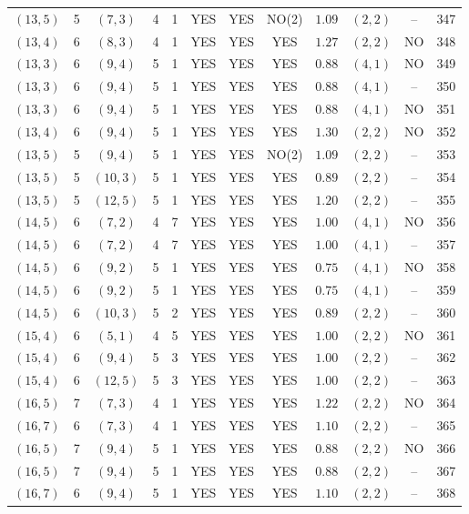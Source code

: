 \begin{longtable}{|c|c|c|c|c|c|c|c|c|c|c|c|}
$(13,5)$ & 5 & $(7,3)$ & 4 & 1 & YES & YES & NO(2) & $1.09$ & $(2,2)$ & -- & 347\\
$(13,4)$ & 6 & $(8,3)$ & 4 & 1 & YES & YES & YES & $1.27$ & $(2,2)$ & NO & 348\\
$(13,3)$ & 6 & $(9,4)$ & 5 & 1 & YES & YES & YES & $0.88$ & $(4,1)$ & NO & 349\\
$(13,3)$ & 6 & $(9,4)$ & 5 & 1 & YES & YES & YES & $0.88$ & $(4,1)$ & -- & 350\\
$(13,3)$ & 6 & $(9,4)$ & 5 & 1 & YES & YES & YES & $0.88$ & $(4,1)$ & NO & 351\\
$(13,4)$ & 6 & $(9,4)$ & 5 & 1 & YES & YES & YES & $1.30$ & $(2,2)$ & NO & 352\\
$(13,5)$ & 5 & $(9,4)$ & 5 & 1 & YES & YES & NO(2) & $1.09$ & $(2,2)$ & -- & 353\\
$(13,5)$ & 5 & $(10,3)$ & 5 & 1 & YES & YES & YES & $0.89$ & $(2,2)$ & -- & 354\\
$(13,5)$ & 5 & $(12,5)$ & 5 & 1 & YES & YES & YES & $1.20$ & $(2,2)$ & -- & 355\\
$(14,5)$ & 6 & $(7,2)$ & 4 & 7 & YES & YES & YES & $1.00$ & $(4,1)$ & NO & 356\\
$(14,5)$ & 6 & $(7,2)$ & 4 & 7 & YES & YES & YES & $1.00$ & $(4,1)$ & -- & 357\\
$(14,5)$ & 6 & $(9,2)$ & 5 & 1 & YES & YES & YES & $0.75$ & $(4,1)$ & NO & 358\\
$(14,5)$ & 6 & $(9,2)$ & 5 & 1 & YES & YES & YES & $0.75$ & $(4,1)$ & -- & 359\\
$(14,5)$ & 6 & $(10,3)$ & 5 & 2 & YES & YES & YES & $0.89$ & $(2,2)$ & -- & 360\\
$(15,4)$ & 6 & $(5,1)$ & 4 & 5 & YES & YES & YES & $1.00$ & $(2,2)$ & NO & 361\\
$(15,4)$ & 6 & $(9,4)$ & 5 & 3 & YES & YES & YES & $1.00$ & $(2,2)$ & -- & 362\\
$(15,4)$ & 6 & $(12,5)$ & 5 & 3 & YES & YES & YES & $1.00$ & $(2,2)$ & -- & 363\\
$(16,5)$ & 7 & $(7,3)$ & 4 & 1 & YES & YES & YES & $1.22$ & $(2,2)$ & NO & 364\\
$(16,7)$ & 6 & $(7,3)$ & 4 & 1 & YES & YES & YES & $1.10$ & $(2,2)$ & -- & 365\\
$(16,5)$ & 7 & $(9,4)$ & 5 & 1 & YES & YES & YES & $0.88$ & $(2,2)$ & NO & 366\\
$(16,5)$ & 7 & $(9,4)$ & 5 & 1 & YES & YES & YES & $0.88$ & $(2,2)$ & -- & 367\\
$(16,7)$ & 6 & $(9,4)$ & 5 & 1 & YES & YES & YES & $1.10$ & $(2,2)$ & -- & 368\\

\end{longtable}
